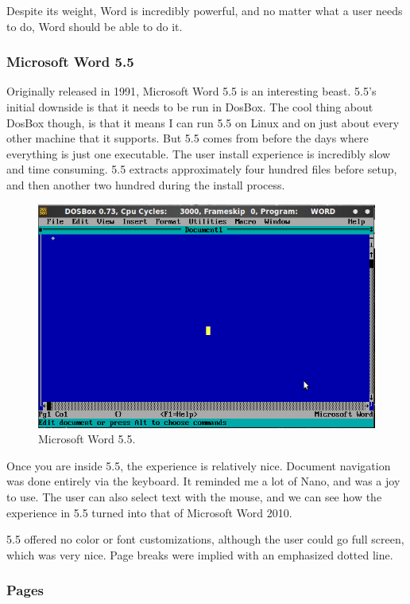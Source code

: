 \documentclass[10pt]{article}
\begin{document}
Despite its weight, Word is incredibly powerful, and no matter what a user needs to do, Word should be able to do it.

\subsubsection{Microsoft Word 5.5}

Originally released in 1991\cite{infoworld}, Microsoft Word 5.5 is an interesting beast. 5.5's initial downside is that it needs to be run in DosBox. The cool thing about DosBox though, is that it means I can run 5.5 on Linux and on just about every other machine that it supports. But 5.5 comes from before the days where everything is just one executable. The user install experience is incredibly slow and time consuming. 5.5 extracts approximately four hundred files before setup, and then another two hundred during the install process.

\begin{figure}
   \centering
      \includegraphics[width=130mm]{images/w55_1.png}
   \caption{Microsoft Word 5.5.}
\end{figure}

Once you are inside 5.5, the experience is relatively nice. Document navigation was done entirely via the keyboard. It reminded me a lot of Nano\cite{nano}, and was a joy to use. The user can also select text with the mouse, and we can see how the experience in 5.5 turned into that of Microsoft Word 2010.

5.5 offered no color or font customizations, although the user could go full screen, which was very nice. Page breaks were implied with an emphasized dotted line.

\subsubsection{Pages}
\end{document}
